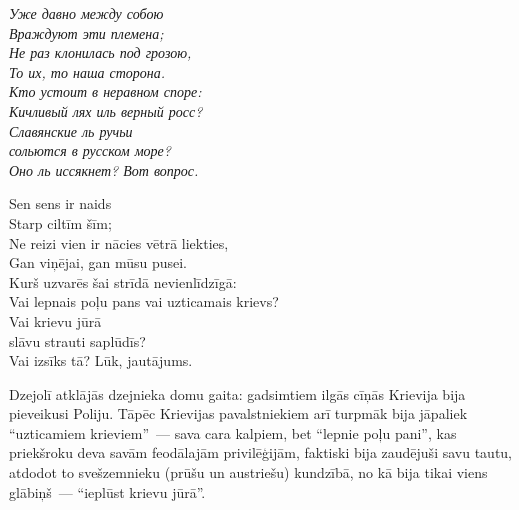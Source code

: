 \documentclass[twoside,a5paper,12pt,fleqn,openany]{extbook}
\newcommand{\pltxti}[1]{\textit{\textpolish{#1}}}
\begin{document}
\vspace{1.5em}

\noindent
\begin{minipage}{0.55\textwidth}
\pltxti{Уже давно между собою\\
Враждуют эти племена;\\
Не раз клонилась под грозою,\\
То их, то наша сторона.\\
Кто устоит в неравном споре:\\
Кичливый лях иль верный росс?\\
Славянские ль ручьи\\
сольются в русском море?\\
Оно ль иссякнет? Вот вопрос.}
\end{minipage}
\hspace{1em}
\begin{minipage}{0.6\textwidth}
Sen sens ir naids\\
Starp ciltīm šīm;\\
Ne reizi vien ir nācies vētrā liekties,\\
Gan viņējai, gan mūsu pusei.\\
Kurš uzvarēs šai strīdā nevienlīdzīgā:\\
Vai lepnais poļu pans vai uzticamais krievs?\\
Vai krievu jūrā\\
slāvu strauti saplūdīs?\\
Vai izsīks tā? Lūk, jautājums.
\end{minipage}

\vspace{1.5em}





Dzejolī atklājās dzejnieka domu gaita: gadsimtiem ilgās cīņās Krievija bija pieveikusi Poliju. Tāpēc Krievijas pavalstniekiem arī turpmāk bija jāpaliek ``uzticamiem krieviem''~--- sava cara kalpiem, bet ``lepnie poļu pani'', kas priekšroku deva savām feodālajām privilēģijām, faktiski bija zaudējuši savu tautu, atdodot to svešzemnieku (prūšu un austriešu) kundzībā, no kā bija tikai viens glābiņš~--- ``ieplūst krievu jūrā''.
\end{document}
